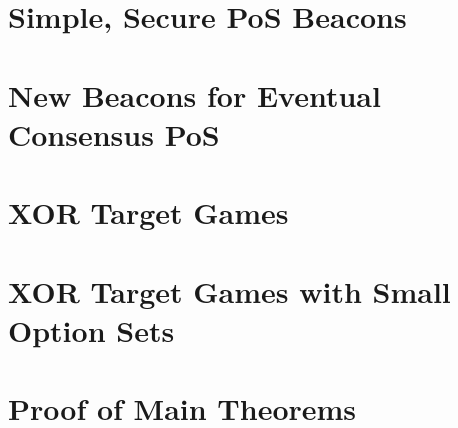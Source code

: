 



\chapter{Simple, Secure PoS Beacons}\label{sec:xorgames-intro}


\chapter{New Beacons for Eventual Consensus PoS}
\label{sec:xorgames-model}

\chapter{XOR Target Games}\label{sec:xor-games}


\chapter{XOR Target Games with Small Option Sets}\label{sec:poisson-bernoulli}



\chapter{Proof of Main Theorems}\label{sec:main-thm-proofs}




